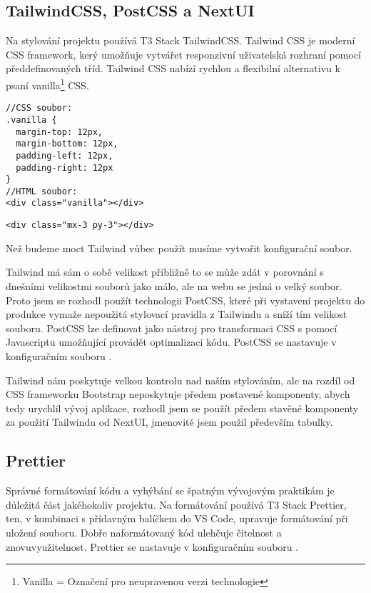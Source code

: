 \subsection{TailwindCSS, PostCSS a NextUI}
Na stylování projektu používá T3 Stack TailwindCSS. Tailwind CSS je moderní CSS framework, kerý umožňuje vytvářet responzivní uživatelská rozhraní pomocí předdefinovaných tříd. Tailwind CSS nabízí rychlou a flexibilní alternativu k psaní vanilla\footnote{Vanilla = Označení pro neupravenou verzi technologie} CSS.
\begin{lstlisting}[caption={Ukázka stylování HTML prvku za použití vanilla CSS\cite{tailwind-example}}]
//CSS soubor:
.vanilla {
  margin-top: 12px,
  margin-bottom: 12px,
  padding-left: 12px,
  padding-right: 12px
}
//HTML soubor:
<div class="vanilla"></div>
\end{lstlisting}
\begin{lstlisting}[caption={Ukázka stylování HTML prvku za použití TailwindCSS\cite{tailwind-example}}]
    <div class="mx-3 py-3"></div>
\end{lstlisting}
Než budeme moct Tailwind vůbec použít musíme vytvořit konfigurační soubor\newline{}.

Tailwind má sám o sobě velikost přibližně  to se může zdát v porovnání s dnešními velikostmi souborů jako málo, ale na webu se jedná o velký soubor. Proto jsem se rozhodl použít technologii PostCSS, které při vystavení projektu do produkce vymaže nepoužitá stylovací pravidla z Tailwindu a sníží tím velikost souboru. PostCSS lze definovat jako nástroj pro transformaci CSS s pomocí Javascriptu umožňující provádět optimalizaci kódu. PostCSS se nastavuje v konfiguračním souboru .

Tailwind nám poskytuje velkou kontrolu nad naším stylováním, ale na rozdíl od CSS frameworku Bootstrap neposkytuje předem postavené komponenty, abych tedy urychlil vývoj aplikace, rozhodl jsem se použít předem stavěné komponenty za použití Tailwindu od NextUI\cite{nextui}, jmenovitě jsem použil především tabulky.

\subsection{Prettier}
Správné formátování kódu a vyhýbání se špatným vývojovým praktikám je důležitá část jakéhokoliv projektu. Na formátování používá T3 Stack Prettier, ten, v kombinaci s přídavným balíčkem do VS Code, upravuje formátování při uložení souboru. Dobře naformátovaný kód ulehčuje čitelnost a znovuvyužitelnost. Prettier se nastavuje v konfiguračním souboru .

